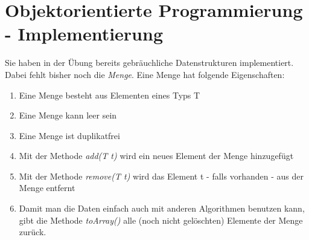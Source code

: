 \documentclass[11pt,a4paper,oneside,ngerman]{scrbook}
\begin{document}
\section{Objektorientierte Programmierung - Implementierung}
Sie haben in der Übung bereits gebräuchliche Datenstrukturen implementiert. Dabei fehlt bisher noch die \emph{Menge}.
Eine Menge hat folgende Eigenschaften:

\begin{enumerate}
  \item Eine Menge besteht aus Elementen eines Typs T
  \item Eine Menge kann leer sein
  \item Eine Menge ist duplikatfrei
  \item Mit der Methode \emph{add(T t)} wird ein neues Element der Menge hinzugefügt
  \item Mit der Methode \emph{remove(T t)} wird das Element t - falls vorhanden - aus der Menge entfernt
  \item Damit man die Daten einfach auch mit anderen Algorithmen benutzen kann, gibt die Methode \emph{toArray()} alle (noch nicht gelöschten) Elemente der Menge zurück.
\end{enumerate}
\end{document}
